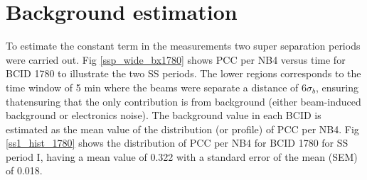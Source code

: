 
\section{Background estimation}
To estimate the constant term in the measurements two super separation periods were carried out. Fig \ref{ssp_wide_bx1780} shows PCC per NB4 versus time for BCID 1780 to illustrate the two SS periods. The lower regions corresponds to the time window of 5 min where the beams were separate a distance of $6\sigma_{b}$, ensuring thatensuring that the only contribution is from background (either beam-induced background or electronics noise).
The background value in each BCID is estimated as the mean value of the distribution (or profile) of PCC per NB4. Fig \ref{ss1_hist_1780} shows the distribution of PCC per NB4 for BCID 1780 for SS period I, having a mean value of 0.322 with a standard error of the mean (SEM) of 0.018.




\newpage

